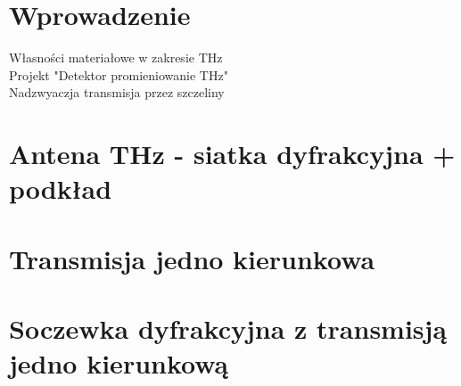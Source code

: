 \section{Wprowadzenie}
Własności materiałowe w zakresie THz\\
Projekt "Detektor promieniowanie THz"\\
Nadzwyaczja transmisja przez szczeliny\\
\section{Antena THz - siatka dyfrakcyjna + podkład}

\section{Transmisja jedno kierunkowa}
\section{Soczewka dyfrakcyjna z transmisją jedno kierunkową}
